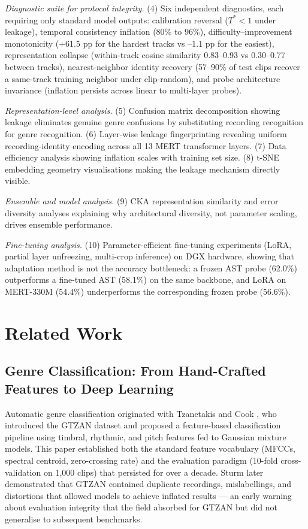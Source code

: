 \documentclass[conference]{IEEEtran}
\begin{document}
\emph{Diagnostic suite for protocol integrity.} (4) Six independent
diagnostics, each requiring only standard model outputs: calibration
reversal (\(T^* < 1\) under leakage), temporal consistency inflation
(80\% to 96\%), difficulty--improvement monotonicity (+61.5 pp for the
hardest tracks vs --1.1 pp for the easiest), representation collapse
(within-track cosine similarity 0.83--0.93 vs 0.30--0.77 between
tracks), nearest-neighbor identity recovery (57--90\% of test clips
recover a same-track training neighbor under clip-random), and probe
architecture invariance (inflation persists across linear to multi-layer
probes).

\emph{Representation-level analysis.} (5) Confusion matrix decomposition
showing leakage eliminates genuine genre confusions by substituting
recording recognition for genre recognition. (6) Layer-wise leakage
fingerprinting revealing uniform recording-identity encoding across all
13 MERT transformer layers. (7) Data efficiency analysis showing
inflation scales with training set size. (8) t-SNE embedding geometry
visualisations making the leakage mechanism directly visible.

\emph{Ensemble and model analysis.} (9) CKA representation similarity
and error diversity analyses explaining why architectural diversity, not
parameter scaling, drives ensemble performance.

\emph{Fine-tuning analysis.} (10) Parameter-efficient fine-tuning
experiments (LoRA, partial layer unfreezing, multi-crop inference) on
DGX hardware, showing that adaptation method is not the accuracy
bottleneck: a frozen AST probe (62.0\%) outperforms a fine-tuned AST
(58.1\%) on the same backbone, and LoRA on MERT-330M (54.4\%)
underperforms the corresponding frozen probe (56.6\%).

\section{Related Work}\label{related-work}

\subsection{Genre Classification: From Hand-Crafted Features to Deep
Learning}\label{a.-genre-classification-from-hand-crafted-features-to-deep-learning}

Automatic genre classification originated with Tzanetakis and Cook
\citep{tzanetakis2002musical}, who introduced the GTZAN dataset and
proposed a feature-based classification pipeline using timbral,
rhythmic, and pitch features fed to Gaussian mixture models. This paper
established both the standard feature vocabulary (MFCCs, spectral
centroid, zero-crossing rate) and the evaluation paradigm (10-fold
cross-validation on 1,000 clips) that persisted for over a decade. Sturm
\citep{sturm2013gtzan} later demonstrated that GTZAN contained duplicate
recordings, mislabellings, and distortions that allowed models to
achieve inflated results --- an early warning about evaluation
integrity that the field absorbed for GTZAN but did not generalise to
subsequent benchmarks.
\end{document}
